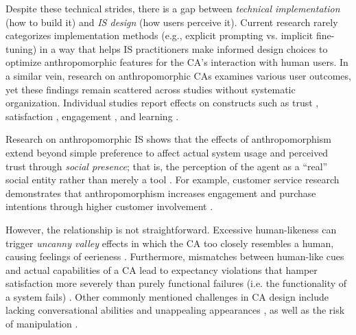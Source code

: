 \documentclass[manuscript,anonymous,sigconf]{acmart}
\begin{document}
Despite these technical strides, there is a gap between \textit{technical implementation} (how to build it) and \textit{IS design} (how users perceive it). Current research rarely categorizes implementation methods (e.g., explicit prompting vs. implicit fine-tuning) in a way that helps IS practitioners make informed design choices to optimize anthropomorphic features for the CA's interaction with human users.
In a similar vein, research on anthropomorphic CAs examines various user outcomes, yet these findings remain scattered across studies without systematic organization. Individual studies report effects on constructs such as trust \citep{nordheim2019trust}, satisfaction \citep{haugeland_understanding_2022}, engagement \citep{mehra_chatbot_2021}, and learning \citep{zheldibayeva_genai_2025}. %

Research on anthropomorphic IS shows that the effects of anthropomorphism extend beyond simple preference to affect actual system usage and perceived trust \citep{pfeuffer2019anthropomorphic,adam2021ai} through \textit{social presence}; that is, the perception of the agent as a ``real'' social entity rather than merely a tool \citep{meyer2023leverage,wang2021seeing}. For example, customer service research demonstrates that anthropomorphism increases engagement and purchase intentions through higher customer involvement \citep{depaula2025anthropomorphism,luo2019frontiers}.

However, the relationship is not straightforward. Excessive human-likeness can trigger \textit{uncanny valley} effects in which the CA too closely resembles a human, causing feelings of eerieness \citep{mori_bukimi_1970,soni2024chatbot}. Furthermore, mismatches between human-like cues and actual capabilities of a CA lead to expectancy violations that hamper satisfaction more severely than purely functional failures (i.e. the functionality of a system fails) \citep{ischen2024communication,qu2024chatbot}. Other commonly mentioned challenges in CA design include lacking conversational abilities and unappealing appearances \citep{diederich_design_2022}, as well as the risk of manipulation \citep{chaves2021should}.
\end{document}
